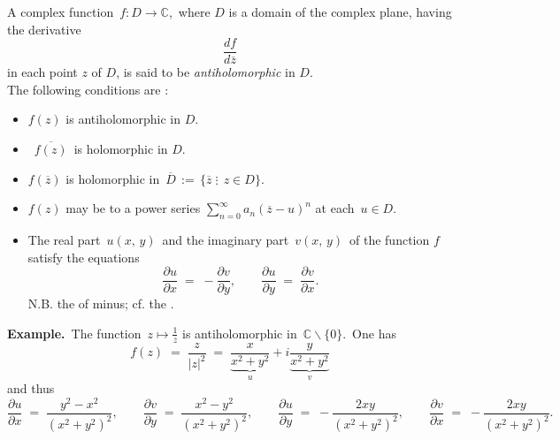 \documentclass[12pt]{article}
\theoremstyle{definition}
\begin{document}

A complex function \,$f\!: D \to \mathbb{C}$,\, where $D$ is a domain of the complex plane, having the derivative 
$$\frac{df}{d \overline{z}}$$
in each point $z$ of $D$, is said to be {\em antiholomorphic} in $D$. \\

The following conditions are :
\begin{itemize}

\item $f(z)$ is antiholomorphic in $D$.

\item \, $\overline{f(z)}$\, is holomorphic in $D$. 

\item $f(\overline{z})$ is holomorphic in\, $\overline{D} \,:=\, \{\overline{z}\;\vdots\;\, z \in D\}$.

\item $f(z)$ may be  to a power series $\sum_{n=0}^\infty a_n(\overline{z}-u)^n$ at each\, $u \in D$.

\item The real part \,$u(x,\,y)$\, and the imaginary part 
\,$v(x,\,y)$\, of the function $f$ satisfy the equations
$$\frac{\partial u}{\partial x} 
\;=\; -\frac{\partial v}{\partial y}, \qquad 
  \frac{\partial u}{\partial y} \;=\; \frac{\partial v}{\partial x}.$$
N.B. the  of minus; cf. the .\\

\end{itemize}

\textbf{Example.}\, The function\, $\displaystyle z \mapsto \frac{1}{\overline{z}}$ is antiholomorphic in\, 
$\mathbb{C}\!\smallsetminus\!\{0\}$.\, One has 
$$f(z) \;=\; \frac{z}{|z|^2} 
       \;=\; \underbrace{\frac{x}{x^2\!+\!y^2}}_{u}+i\underbrace{\frac{y}{x^2\!+\!y^2}}_{v}$$
and thus         
$$\frac{\partial u}{\partial x} 
\;=\; \frac{y^2\!-\!x^2}{(x^2\!+\!y^2)^2},  \qquad
\frac{\partial v}{\partial y}
\;=\; \frac{x^2\!-\!y^2}{(x^2\!+\!y^2)^2},  \qquad 
\frac{\partial u}{\partial y} 
\;=\; -\frac{2xy}{(x^2\!+\!y^2)^2},  \qquad
\frac{\partial v}{\partial x} \;=\; -\frac{2xy}{(x^2\!+\!y^2)^2}.$$


\end{document}
